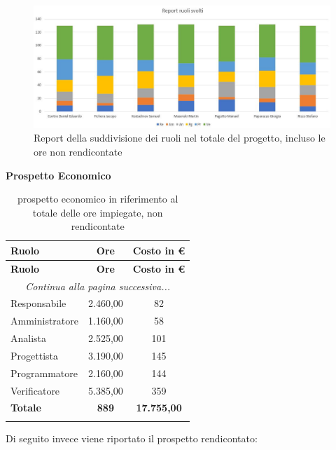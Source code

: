 \documentclass[../piano_di_progetto.tex]{subfiles}
\begin{document}
\begin{figure}[H]
\centering
\includegraphics[width=12cm]{componenti/img/report_ruoli_tot}
\caption{Report della suddivisione dei ruoli nel totale del progetto, incluso le ore non rendicontate}
\end{figure}

\textbf{Prospetto Economico}

\begin{center}
	\begin{longtable}{|l|c|c|}
		\hline
		\rowcolor{lightgray}
		\textbf{Ruolo} & \textbf{Ore} & \textbf{Costo in €}\\

		\hline
		\endfirsthead
	
	\hline
	\rowcolor{lightgray}
	\textbf{Ruolo} & \textbf{Ore} & \textbf{Costo in €}\\
	\hline
	\endhead
	
	\hline
	\multicolumn{3}{|c|}{\emph{Continua alla pagina successiva...}}\\
	\hline
	\endfoot

	\endlastfoot
		Responsabile & 2.460,00 & 82 \\
		Amministratore & 1.160,00 & 58 \\
		Analista & 2.525,00 & 101 \\
		Progettista & 3.190,00 & 145 \\
		Programmatore & 2.160,00 & 144 \\
		Verificatore & 5.385,00 & 359 \\
		\textbf{Totale} & \textbf{889} & \textbf{17.755,00}\\
		\hline

		\caption{prospetto economico in riferimento al totale delle ore impiegate, non rendicontate}
	\end{longtable}
\end{center}


Di seguito invece viene riportato il prospetto rendicontato:\\
\end{document}
